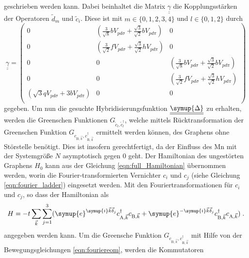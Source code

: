 geschrieben werden kann.
Dabei beinhaltet die Matrix $\underline{\underline{\gamma}}$ die Kopplungsstärken der Operatoren $\tilde{d}_m$ und $\tilde{c}_i$.
Diese ist mit $m \in \{ 0,1,2,3,4 \}$ und $l \in \{ 0,1,2 \}$ durch
\begin{equation*}
     \underline{\underline{\gamma}} = 
    \begin{pmatrix}
        0               & \left ( \frac{3}{\sqrt{8}} b V_{pd\sigma} + \frac{\sqrt{3}}{\sqrt{2}}  b   V_{pd\pi} \right )    &   0           \\
        0               & \left ( \frac{3}{\sqrt{2}} f V_{pd\sigma} + \frac{\sqrt{3}}{\sqrt{2}}  h   V_{pd\pi} \right )   &   0           \\
        0               & 0             &   \left ( \frac{3}{\sqrt{8}} b V_{pd\sigma} + \frac{\sqrt{3}}{\sqrt{2}}  b   V_{pd\pi} \right ) \\
        0               & 0             &   \left ( \frac{3}{\sqrt{2}} f V_{pd\sigma} + \frac{\sqrt{3}}{\sqrt{2}}  h   V_{pd\pi} \right ) \\
        \left (  \sqrt{3} q V_{pd\sigma} + 3 b V_{pd\pi} \right )     & 0             &   0           \\
    \end{pmatrix}
\end{equation*}
gegeben.
Um nun die gesuchte Hybridisierungsfunktion $\underline{\underline{\symup{\Delta}}}$ zu erhalten, werden die Greenschen Funktionen
$G_{\tilde{c}_l, \tilde{c}_l^{\dagger}}$, welche mittels Rücktransformation der Greenschen Funktion 
$G_{c_{\text{B}, \vec{k}}, c_{\text{B}, \vec{k}}^\dagger}$ ermittelt werden können, des Graphens ohne Störstelle benötigt.
Dies ist insofern gerechtfertigt, da der Einfluss des Mn mit der Systemgröße $N$ asymptotisch gegen 0 geht.
Der Hamiltonian des ungestörten Graphens $H_0$ kann aus der Gleichung \eqref{eqn:full_Hamiltonian} übernommen werden,
worin die Fourier-transformierten Vernichter $c_i$ und $c_j$ (siehe Gleichung \eqref{eqn:fourier_ladder}) eingesetzt werden.
Mit den Fouriertransformationen für $c_i$ und $c_j$, so dass der Hamiltonian als 
\begin{equation}
    H = -t \sum_{\vec{k}}\sum_{j=1}^3( \symup{e}^{\symup{i}\vec{k}\vec{\delta}_j}c^\dagger_{\text{A},\vec{k}} c_{\text{B},\vec{k}} + \symup{e}^{-\symup{i}\vec{k}\vec{\delta}_j}c^\dagger_{\text{B},\vec{k}} c_{\text{A},\vec{k}} ) \; .
\end{equation} 
angegeben werden kann.
Um die Greensche Funktion $G_{c_{\text{B}, \vec{k}}, c_{\text{B}, \vec{k}}^\dagger}$ mit Hilfe von der Bewegungsgleichungen \eqref{eqn:fouriereom}, werden die Kommutatoren
